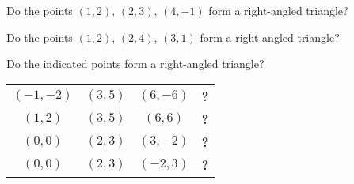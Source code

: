 \begin{frame}
\begin{example}
Do the points $(1,2)$, $(2,3)$, $(4,-1)$ form a right-angled triangle?
\end{example}
\begin{example}
Do the points $(1,2)$, $(2,4)$, $(3,1)$ form a right-angled triangle?
\end{example}

\begin{example}
Do the indicated points form a right-angled triangle?
\begin{tabular}{cccc}
$(-1,-2)$& $(3,5)$& $(6,-6)$&\textbf{?}\\
$(1,2)$& $(3,5)$& $(6,6)$&\textbf{?}\\
$(0,0)$& $(2,3)$& $(3,-2)$&\textbf{?}\\
$(0,0)$& $(2,3)$& $(-2,3)$&\textbf{?}\\
\end{tabular}
\end{example}
\end{frame}
